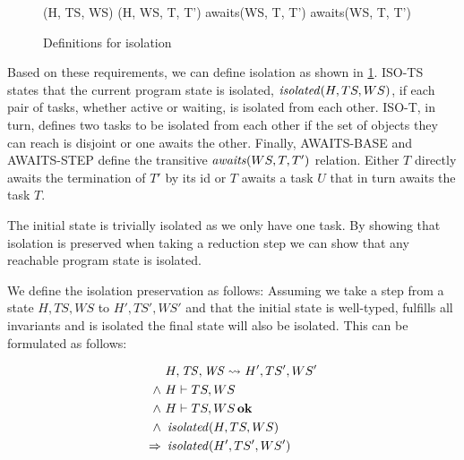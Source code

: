 \begin{figure}
    \centering
{}
    {(H, TS, WS)}
\vspace{3mm}
    {(H, WS, T, T')}
\vspace{3mm}
    {awaits(WS, T, T')}
\vspace{3mm}
    {awaits(WS, T, T')}

    \caption{Definitions for isolation}
    \label{fig:isolation-def}
\end{figure}

Based on these requirements, we can define isolation as shown in \cref{fig:isolation-def}. ISO-TS states that the current program state is isolated, $\mathop{\mathit{isolated}}(H, TS, WS)$, if each pair of tasks, whether active or waiting, is isolated from each other. ISO-T, in turn, defines two tasks to be isolated from each other if the set of objects they can reach is disjoint or one awaits the other. Finally, AWAITS-BASE and AWAITS-STEP define the transitive $\mathop{\mathit{awaits}}(WS, T, T')$ relation. Either $T$ directly awaits the termination of $T'$ by its id or $T$ awaits a task $U$ that in turn awaits the task $T$.

The initial state is trivially isolated as we only have one task. By showing that isolation is preserved when taking a reduction step we can show that any reachable program state is isolated.

We define the isolation preservation as follows: Assuming we take a step from a state $H, TS, WS$ to $H', TS', WS'$ and that the initial state is well-typed, fulfills all invariants and is isolated the final state will also be isolated. This can be formulated as follows: 

\begin{theorem}[Isolation]
\begin{alignat}{3}
    &\reductasks{}*[H']{}[TS',WS']* \label{iso-prem-reduc}\\
    \wedge\ & H \vdash TS, WS\\
    \wedge\ & H \vdash TS, WS \bn{ok} \label{iso-prem-ok}\\
    \wedge\ & \vn{isolated}(H, TS, WS) \label{iso-prem-iso}\\
    \Rightarrow\ & \vn{isolated}(H', TS', WS') \label{iso-concl}
\end{alignat}
\end{theorem}


